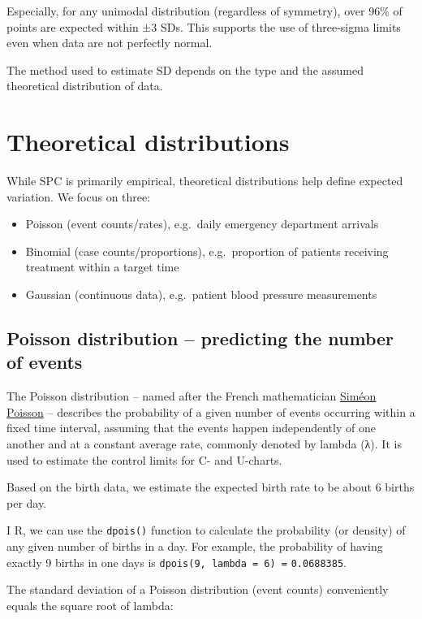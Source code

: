 \documentclass[
]{book}
\providecommand{\tightlist}{%
  \setlength{\itemsep}{0pt}\setlength{\parskip}{0pt}}
\begin{document}
Especially, for any unimodal distribution (regardless of symmetry), over
96\% of points are expected within ±3 SDs. This supports the use of
three-sigma limits even when data are not perfectly normal.

The method used to estimate SD depends on the type and the assumed
theoretical distribution of data.

\section{Theoretical distributions}\label{theoretical-distributions}

While SPC is primarily empirical, theoretical distributions help define
expected variation. We focus on three:

\begin{itemize}
\tightlist
\item
  Poisson (event counts/rates), e.g.~daily emergency department arrivals
\item
  Binomial (case counts/proportions), e.g.~proportion of patients
  receiving treatment within a target time
\item
  Gaussian (continuous data), e.g.~patient blood pressure measurements
\end{itemize}

\subsection{Poisson distribution -- predicting the number of
events}\label{poisson-distribution-predicting-the-number-of-events}

The Poisson distribution -- named after the French mathematician
\href{https://en.wikipedia.org/wiki/Sim\%C3\%A9on_Denis_Poisson}{Siméon
Poisson} -- describes the probability of a given number of events
occurring within a fixed time interval, assuming that the events happen
independently of one another and at a constant average rate, commonly
denoted by lambda (λ). It is used to estimate the control limits for C-
and U-charts.

Based on the birth data, we estimate the expected birth rate to be about
6 births per day.

I R, we can use the \texttt{dpois()} function to calculate the
probability (or density) of any given number of births in a day. For
example, the probability of having exactly 9 births in one days is
\texttt{dpois(9,\ lambda\ =\ 6)\ =} \texttt{0.0688385}.

The standard deviation of a Poisson distribution (event counts)
conveniently equals the square root of lambda:
\end{document}
